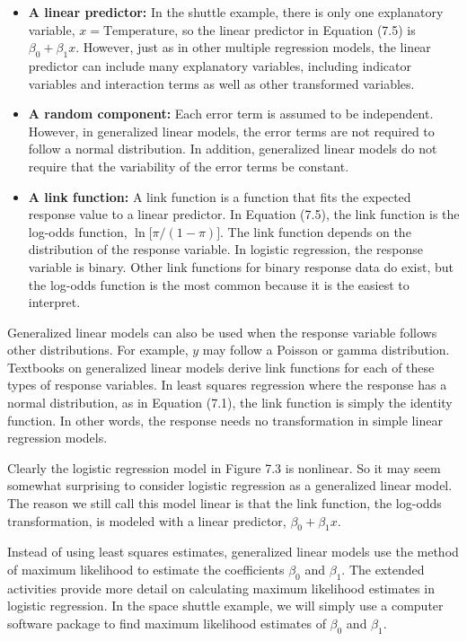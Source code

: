 \documentclass[
]{report}
\begin{document}
\begin{itemize}
  \item \textbf{A linear predictor:} In the shuttle example, there is only one explanatory variable, $x = \text{Temperature}$, so the linear predictor in Equation (7.5) is $\beta_0 + \beta_1 x$. However, just as in other multiple regression models, the linear predictor can include many explanatory variables, including indicator variables and interaction terms as well as other transformed variables.
  \item \textbf{A random component:} Each error term is assumed to be independent. However, in generalized linear models, the error terms are not required to follow a normal distribution. In addition, generalized linear models do not require that the variability of the error terms be constant.
  \item \textbf{A link function:} A link function is a function that fits the expected response value to a linear predictor. In Equation (7.5), the link function is the log-odds function, $\ln\bigl[\pi/(1 - \pi)\bigr]$. The link function depends on the distribution of the response variable. In logistic regression, the response variable is binary. Other link functions for binary response data do exist, but the log-odds function is the most common because it is the easiest to interpret.
\end{itemize}

Generalized linear models can also be used when the response variable follows other distributions. For example, \(y\) may follow a Poisson or gamma distribution. Textbooks on generalized linear models derive link functions for each of these types of response variables. In least squares regression where the response has a normal distribution, as in Equation (7.1), the link function is simply the identity function. In other words, the response needs no transformation in simple linear regression models.

Clearly the logistic regression model in Figure 7.3 is nonlinear. So it may seem somewhat surprising to consider logistic regression as a generalized linear model. The reason we still call this model linear is that the link function, the log-odds transformation, is modeled with a linear predictor, \(\beta_0 + \beta_1 x\).

Instead of using least squares estimates, generalized linear models use the method of maximum likelihood to estimate the coefficients \(\beta_0\) and \(\beta_1\). The extended activities provide more detail on calculating maximum likelihood estimates in logistic regression. In the space shuttle example, we will simply use a computer software package to find maximum likelihood estimates of \(\beta_0\) and \(\beta_1\).
\end{document}
